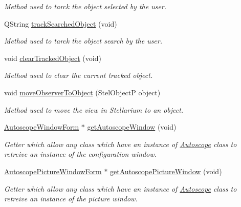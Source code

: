 \begin{DoxyCompactItemize}
\begin{DoxyCompactList}\small\item\em Method used to tarck the object selected by the user. \end{DoxyCompactList}\item 
Q\+String \mbox{\hyperlink{class_autoscope_ac5a2819eb2d6971becc544d9f7136b79}{track\+Searched\+Object}} (void)
\begin{DoxyCompactList}\small\item\em Method used to tarck the object search by the user. \end{DoxyCompactList}\item 
void \mbox{\hyperlink{class_autoscope_a2bf2306aa6d3f37dadd83e6e00a35ff3}{clear\+Tracked\+Object}} (void)
\begin{DoxyCompactList}\small\item\em Method used to clear the current tracked object. \end{DoxyCompactList}\item 
void \mbox{\hyperlink{class_autoscope_ac8f9e09385739a5ba5ed460c83ec88df}{move\+Observer\+To\+Object}} (Stel\+ObjectP object)
\begin{DoxyCompactList}\small\item\em Method used to move the view in Stellarium to an object. \end{DoxyCompactList}\item 
\mbox{\hyperlink{class_autoscope_window_form}{Autoscope\+Window\+Form}} $\ast$ \mbox{\hyperlink{class_autoscope_aad8f888c886f1f3e36878e8c3e658813}{get\+Autoscope\+Window}} (void)
\begin{DoxyCompactList}\small\item\em Getter which allow any class which have an instance of \mbox{\hyperlink{class_autoscope}{Autoscope}} class to retreive an instance of the configuration window. \end{DoxyCompactList}\item 
\mbox{\hyperlink{class_autoscope_picture_window_form}{Autoscope\+Picture\+Window\+Form}} $\ast$ \mbox{\hyperlink{class_autoscope_a78d970ac013a0640bc28cac027737848}{get\+Autoscope\+Picture\+Window}} (void)
\begin{DoxyCompactList}\small\item\em Getter which allow any class which have an instance of \mbox{\hyperlink{class_autoscope}{Autoscope}} class to retreive an instance of the picture window. \end{DoxyCompactList}\item 

\end{DoxyCompactItemize}
